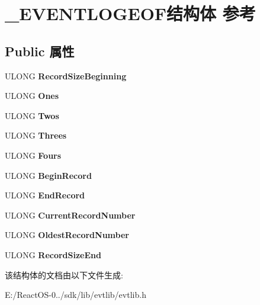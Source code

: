 \hypertarget{struct___e_v_e_n_t_l_o_g_e_o_f}{}\section{\+\_\+\+E\+V\+E\+N\+T\+L\+O\+G\+E\+O\+F结构体 参考}
\label{struct___e_v_e_n_t_l_o_g_e_o_f}
\subsection*{Public 属性}
\begin{DoxyCompactItemize}
\item 
\mbox{\label{struct___e_v_e_n_t_l_o_g_e_o_f_a9d6ec57fbe8646b6f63c7306cc2355dd}} 
U\+L\+O\+NG {\bfseries Record\+Size\+Beginning}
\item 
\mbox{\label{struct___e_v_e_n_t_l_o_g_e_o_f_a9c3172b24b958fe80be924b230404ec6}} 
U\+L\+O\+NG {\bfseries Ones}
\item 
\mbox{\label{struct___e_v_e_n_t_l_o_g_e_o_f_acb53520e6efb6f60866109e736db37a6}} 
U\+L\+O\+NG {\bfseries Twos}
\item 
\mbox{\label{struct___e_v_e_n_t_l_o_g_e_o_f_a6793941c4cb1a98cc84f755ad2f10702}} 
U\+L\+O\+NG {\bfseries Threes}
\item 
\mbox{\label{struct___e_v_e_n_t_l_o_g_e_o_f_ad7f73eea90377c07cc078380b9f9b70b}} 
U\+L\+O\+NG {\bfseries Fours}
\item 
\mbox{\label{struct___e_v_e_n_t_l_o_g_e_o_f_a4998f02fcf1bd334726f9f3dddb3d17c}} 
U\+L\+O\+NG {\bfseries Begin\+Record}
\item 
\mbox{\label{struct___e_v_e_n_t_l_o_g_e_o_f_a17037621842e8e46129b2b3a2b4ae556}} 
U\+L\+O\+NG {\bfseries End\+Record}
\item 
\mbox{\label{struct___e_v_e_n_t_l_o_g_e_o_f_a2614ccef1c3a10498df29f6b61e44371}} 
U\+L\+O\+NG {\bfseries Current\+Record\+Number}
\item 
\mbox{\label{struct___e_v_e_n_t_l_o_g_e_o_f_ad527232ee0347b8fbd88d8119baa78cd}} 
U\+L\+O\+NG {\bfseries Oldest\+Record\+Number}
\item 
\mbox{\label{struct___e_v_e_n_t_l_o_g_e_o_f_ad11dab98a805e45a01a0061febb58248}} 
U\+L\+O\+NG {\bfseries Record\+Size\+End}
\end{DoxyCompactItemize}


该结构体的文档由以下文件生成\+:\begin{DoxyCompactItemize}
\item 
E\+:/\+React\+O\+S-\/0../sdk/lib/evtlib/evtlib.\+h\end{DoxyCompactItemize}
